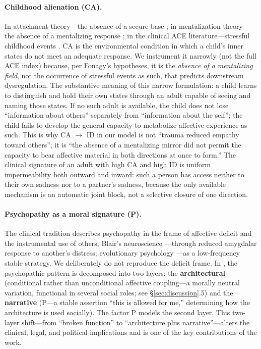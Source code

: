 \paragraph{Childhood alienation (CA).}
In attachment theory---the absence of a secure base \citep{bowlby1969, ainsworth1978}; in mentalization theory---the absence of a mentalizing response \citep{fonagy2002}; in the clinical ACE literature---stressful childhood events \citep{felitti1998}. CA is the environmental condition in which a child's inner states do not meet an adequate response. We instrument it narrowly (not the full ACE index) because, per Fonagy's hypotheses, it is the \emph{absence of a mentalizing field}, not the occurrence of stressful events as such, that predicts downstream dysregulation. The substantive meaning of this narrow formulation: a child learns to distinguish and hold their own states through an adult capable of seeing and naming those states. If no such adult is available, the child does not lose ``information about others'' separately from ``information about the self''; the child fails to develop the general capacity to metabolize affective experience as such. This is why CA $\to$ ID in our model is not ``trauma reduced empathy toward others''; it is ``the absence of a mentalizing mirror did not permit the capacity to bear affective material in both directions at once to form.'' The clinical signature of an adult with high CA and high ID is uniform impermeability both outward and inward: such a person has access neither to their own sadness nor to a partner's sadness, because the only available mechanism is an automatic joint block, not a selective closure of one direction.

\paragraph{Psychopathy as a moral signature (P).}
The clinical tradition \citep{cleckley1941, hare1991} describes psychopathy in the frame of affective deficit and the instrumental use of others; Blair's neuroscience \citep{blair1995, blair2013}---through reduced amygdalar response to another's distress; evolutionary psychology \citep{mealey1995, lalumiere2001}---as a low-frequency stable strategy. We deliberately do not reproduce the deficit frame. In \DEIC{}, the psychopathic pattern is decomposed into two layers: the \textbf{architectural} (conditional rather than unconditional affective coupling---a morally neutral variation, functional in several social roles; see §\ref{sec:discussion}.5) and the \textbf{narrative} (P---a stable assertion ``this is allowed for me,'' determining how the architecture is used socially). The factor P models the second layer. This two-layer shift---from ``broken function'' to ``architecture plus narrative''---alters the clinical, legal, and political implications and is one of the key contributions of the work.

